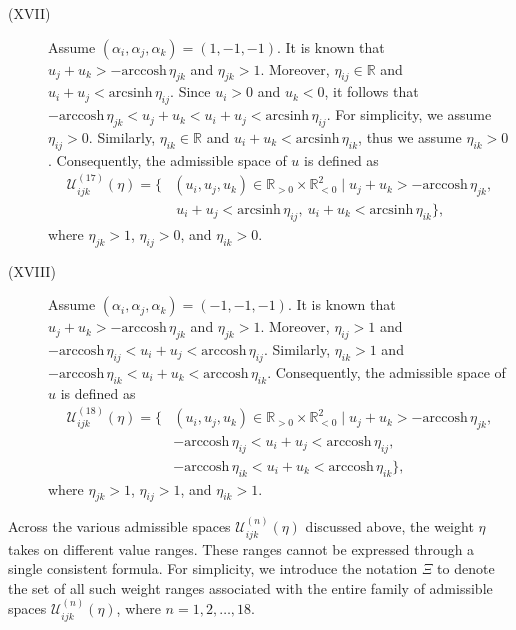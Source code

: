 \documentclass[12pt]{amsart}
\theoremstyle{definition}
\begin{document}
\begin{description}
\item[(XVII)]
Assume $(\alpha_i,\alpha_j,\alpha_k)=(1,-1,-1)$.
It is known that $u_j+u_k>-\mathrm{arccosh}\, \eta_{jk}$ and $\eta_{jk}>1$.
Moreover, $\eta_{ij}\in \mathbb{R}$ and $u_i+u_j<\mathrm{arcsinh}\, \eta_{ij}$.
Since $u_i>0$ and $u_k<0$, it follows that  $-\mathrm{arccosh}\, \eta_{jk}<u_j+u_k<u_i+u_j<\mathrm{arcsinh}\, \eta_{ij}$.
For simplicity, we assume $\eta_{ij}>0$.
Similarly, $\eta_{ik}\in \mathbb{R}$ and $u_i+u_k<\mathrm{arcsinh}\, \eta_{ik}$, thus we assume $\eta_{ik}>0$.
Consequently, the admissible space of $u$ is defined as
\begin{equation*}
\begin{aligned}
\mathcal{U}^{(17)}_{ijk}(\eta)
=\{&(u_i,u_j,u_k)\in \mathbb{R}_{>0}\times\mathbb{R}^2_{<0}
\mid u_j+u_k>-\mathrm{arccosh}\, \eta_{jk}, \\
&\ u_i+u_j<\mathrm{arcsinh}\, \eta_{ij},\
u_i+u_k<\mathrm{arcsinh}\, \eta_{ik}\},
\end{aligned}
\end{equation*}
where $\eta_{jk}>1$, $\eta_{ij}>0$, and $\eta_{ik}>0$.

\item[(XVIII)]
Assume $(\alpha_i,\alpha_j,\alpha_k)=(-1,-1,-1)$.
It is known that $u_j+u_k>-\mathrm{arccosh}\, \eta_{jk}$ and $\eta_{jk}>1$.
Moreover, $\eta_{ij}>1$ and $-\mathrm{arccosh}\, \eta_{ij}<u_i+u_j<\mathrm{arccosh}\, \eta_{ij}$.
Similarly, $\eta_{ik}>1$ and $-\mathrm{arccosh}\, \eta_{ik}<u_i+u_k<\mathrm{arccosh}\, \eta_{ik}$.
Consequently, the admissible space of $u$ is defined as
\begin{equation*}
\begin{aligned}
\mathcal{U}^{(18)}_{ijk}(\eta)
=\{&(u_i,u_j,u_k)\in \mathbb{R}_{>0}\times\mathbb{R}^2_{<0}
\mid u_j+u_k>-\mathrm{arccosh}\, \eta_{jk}, \\
&-\mathrm{arccosh}\, \eta_{ij}<u_i+u_j<\mathrm{arccosh}\, \eta_{ij},\ \\
&-\mathrm{arccosh}\, \eta_{ik}<u_i+u_k<\mathrm{arccosh}\, \eta_{ik}\},
\end{aligned}
\end{equation*}
where $\eta_{jk}>1$, $\eta_{ij}>1$, and $\eta_{ik}>1$.
\end{description}

Across the various admissible spaces $\mathcal{U}^{(n)}_{ijk}(\eta)$ discussed above, 
the weight $\eta$ takes on different value ranges. 
These ranges cannot be expressed through a single consistent formula. 
For simplicity, we introduce the notation $\Xi$ to denote the set of all such weight ranges associated with the entire family of admissible spaces $\mathcal{U}^{(n)}_{ijk}(\eta)$, where $n = 1, 2, \dots, 18$.
\end{document}
